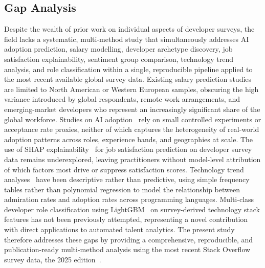 \documentclass[journal, onecolumn]{IEEEtran}
\begin{document}
\subsection{Gap Analysis}

Despite the wealth of prior work on individual aspects of developer surveys, the field lacks a systematic, multi-method study that simultaneously addresses AI adoption prediction, salary modelling, developer archetype discovery, job satisfaction explainability, sentiment group comparison, technology trend analysis, and role classification within a single, reproducible pipeline applied to the most recent available global survey data.
Existing salary prediction studies~\cite{huang2022predicting, li2022developer} are limited to North American or Western European samples, obscuring the high variance introduced by global respondents, remote work arrangements, and emerging-market developers who represent an increasingly significant share of the global workforce.
Studies on AI adoption~\cite{vaithilingam2022expectation, peng2023impact} rely on small controlled experiments or acceptance rate proxies, neither of which captures the heterogeneity of real-world adoption patterns across roles, experience bands, and geographies at scale.
The use of SHAP explainability~\cite{lundberg2017unified} for job satisfaction prediction on developer survey data remains underexplored, leaving practitioners without model-level attribution of which factors most drive or suppress satisfaction scores.
Technology trend analyses~\cite{storey2022disrupting} have been descriptive rather than predictive, using simple frequency tables rather than polynomial regression to model the relationship between admiration rates and adoption rates across programming languages.
Multi-class developer role classification using LightGBM~\cite{ke2017lightgbm} on survey-derived technology stack features has not been previously attempted, representing a novel contribution with direct applications to automated talent analytics.
The present study therefore addresses these gaps by providing a comprehensive, reproducible, and publication-ready multi-method analysis using the most recent Stack Overflow survey data, the 2025 edition~\cite{stackoverflow2025survey}.
\end{document}
